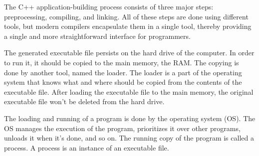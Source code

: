 The C++ application-building process consists of three major steps: preprocessing, compiling, and linking. All of these steps are done using different tools, but modern compilers encapsulate them in a single tool, thereby providing a single and more straightforward interface for programmers. \par
The generated executable file persists on the hard drive of the computer. In order to run it, it should be copied to the main memory, the RAM. The copying is done by another tool, named the loader. The loader is a part of the operating system that knows what and where should be copied from the contents of the executable file. After loading the executable file to the main memory, the original executable file won't be deleted from the hard drive. \par
The loading and running of a program is done by the operating system (OS). The OS manages the execution of the program, prioritizes it over other programs, unloads it when it's done, and so on. The running copy of the program is called a process. A process is an instance of an executable file. \par










